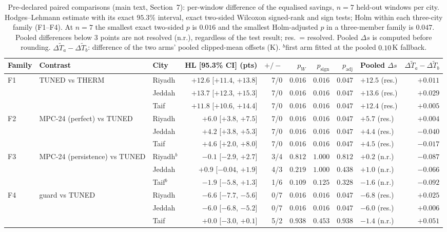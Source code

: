 \documentclass[11pt]{article}
\begin{document}
\begin{table}[!ht]
\centering
\caption{Pre-declared paired comparisons (main text, Section~7): per-window difference of the equalised savings, $n=7$ held-out windows per city. Hodges--Lehmann estimate with its exact $95.3\%$ interval, exact two-sided Wilcoxon signed-rank and sign tests; Holm within each three-city family (F1--F4). At $n=7$ the smallest exact two-sided $p$ is $0.016$ and the smallest Holm-adjusted $p$ in a three-member family is $0.047$. Pooled differences below $3$ points are not resolved (n.r.), regardless of the test result; res.\ = resolved. Pooled $\Delta s$ is computed before rounding. $\Delta\tilde T_a-\Delta\tilde T_b$: difference of the two arms' pooled clipped-mean offsets (K). $^{b}$first arm fitted at the pooled $0.10\,$K fallback.}
\label{tab:s-stats}
\footnotesize\setlength{\tabcolsep}{3pt}
\begin{tabularx}{\textwidth}{@{}l>{\raggedright\arraybackslash}Xlrrrrrlr@{}}
\toprule
Family & Contrast & City & HL [95.3\% CI] (pts) & $+/-$ & $p_W$ & $p_{\mathrm{sign}}$ & $p_{\mathrm{adj}}$ & Pooled $\Delta s$ & $\Delta\tilde T_a-\Delta\tilde T_b$ \\
\midrule
F1 & TUNED vs THERM & Riyadh & $+12.6$ [$+11.4$, $+13.8$] & 7/0 & $0.016$ & $0.016$ & $0.047$ & $+12.5$ (res.) & $+0.011$ \\
 &  & Jeddah & $+13.7$ [$+12.3$, $+15.3$] & 7/0 & $0.016$ & $0.016$ & $0.047$ & $+13.6$ (res.) & $+0.029$ \\
 &  & Taif & $+11.8$ [$+10.6$, $+14.4$] & 7/0 & $0.016$ & $0.016$ & $0.047$ & $+12.4$ (res.) & $+0.005$ \\
F2 & MPC-24 (perfect) vs TUNED & Riyadh & $+6.0$ [$+3.8$, $+7.5$] & 7/0 & $0.016$ & $0.016$ & $0.047$ & $+5.7$ (res.) & $+0.004$ \\
 &  & Jeddah & $+4.2$ [$+3.8$, $+5.3$] & 7/0 & $0.016$ & $0.016$ & $0.047$ & $+4.4$ (res.) & $-0.040$ \\
 &  & Taif & $+4.6$ [$+2.0$, $+8.0$] & 7/0 & $0.016$ & $0.016$ & $0.047$ & $+4.5$ (res.) & $-0.017$ \\
F3 & MPC-24 (persistence) vs TUNED & Riyadh$^{b}$ & $-0.1$ [$-2.9$, $+2.7$] & 3/4 & $0.812$ & $1.000$ & $0.812$ & $+0.2$ (n.r.) & $-0.087$ \\
 &  & Jeddah & $+0.9$ [$-0.04$, $+1.9$] & 4/3 & $0.219$ & $1.000$ & $0.438$ & $+1.0$ (n.r.) & $-0.066$ \\
 &  & Taif$^{b}$ & $-1.9$ [$-5.8$, $+1.3$] & 1/6 & $0.109$ & $0.125$ & $0.328$ & $-1.6$ (n.r.) & $-0.092$ \\
F4 & guard vs TUNED & Riyadh & $-6.6$ [$-7.7$, $-5.6$] & 0/7 & $0.016$ & $0.016$ & $0.047$ & $-6.8$ (res.) & $+0.025$ \\
 &  & Jeddah & $-6.0$ [$-6.8$, $-5.2$] & 0/7 & $0.016$ & $0.016$ & $0.047$ & $-6.0$ (res.) & $+0.006$ \\
 &  & Taif & $+0.0$ [$-3.0$, $+0.1$] & 5/2 & $0.938$ & $0.453$ & $0.938$ & $-1.4$ (n.r.) & $+0.051$ \\
\bottomrule
\end{tabularx}
\end{table}
\end{document}
